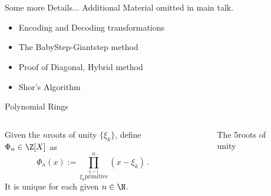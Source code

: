 \appendix
\section{\appendixname}
\begin{frame}{Some more Details...}
  Additional Material omitted in main talk.

  \begin{itemize}
    \item Encoding and Decoding transformations
    \item The BabyStep-Giantstep method
    \item Proof of Diagonal, Hybrid method
    \item Shor's Algorithm
  \end{itemize}
\end{frame}

\begin{frame}{Polynomial Rings}
  \begin{columns}
    \begin{column}{0.6\linewidth}
      \begin{definition}
        Given the $n$\th roots of unity $\{\xi_k\}$, define $\Phi_n \in \Z[X]$ as
        $$\Phi_n(x) := \prod_{\stackrel{k=1}{\xi_k \mathrm{primitive}}}^{n} (x - \xi_k) \,.$$
        It is unique for each given $n \in \N$.
      \end{definition}
    \end{column}
    \begin{column}{0.32\linewidth}
      \begin{figure}
        \caption{The 5\th roots of unity}
        \label{fig:nth-roots-of-unity}
      \end{figure}
    \end{column}
  \end{columns}
\end{frame}

